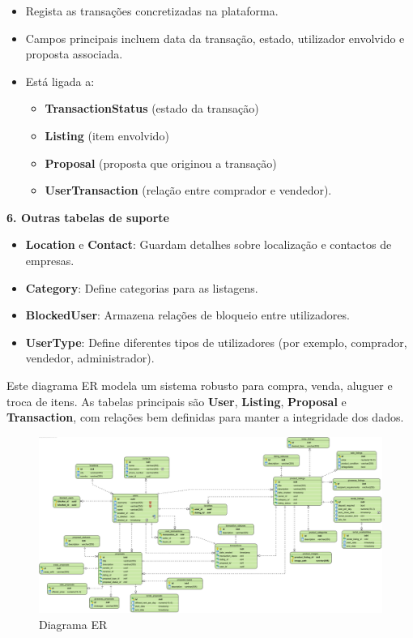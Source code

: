 \documentclass[a4paper, 12pt]{article} %
\begin{document}
\begin{itemize}
    \item Regista as transações concretizadas na plataforma.
    \item Campos principais incluem data da transação, estado, utilizador envolvido e proposta associada.
    \item Está ligada a:
    \begin{itemize}
        \item \textbf{TransactionStatus} (estado da transação)
        \item \textbf{Listing} (item envolvido)
        \item \textbf{Proposal} (proposta que originou a transação)
        \item \textbf{UserTransaction} (relação entre comprador e vendedor).
    \end{itemize}
\end{itemize}
\textbf{6. Outras tabelas de suporte}

\begin{itemize}
    \item \textbf{Location} e \textbf{Contact}: Guardam detalhes sobre localização e contactos de empresas.
    \item \textbf{Category}: Define categorias para as listagens.
    \item \textbf{BlockedUser}: Armazena relações de bloqueio entre utilizadores.
    \item \textbf{UserType}: Define diferentes tipos de utilizadores (por exemplo, comprador, vendedor, administrador).
\end{itemize}

Este diagrama ER modela um sistema robusto para compra, venda, aluguer e troca de itens. As tabelas principais são \textbf{User}, \textbf{Listing}, \textbf{Proposal} e \textbf{Transaction}, com relações bem definidas para manter a integridade dos dados.


\begin{figure}[ht]
	\centering
	\includegraphics[width=\textwidth]{../images/entity-relationship-diagram.png}
	\caption{Diagrama ER}
	\label{fig:diagrama_er}
\end{figure}
\end{document}
